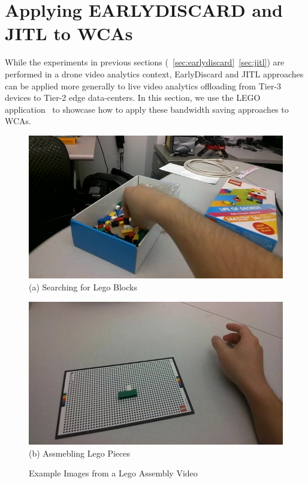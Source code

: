 \section{Applying {\xc EARLYDISCARD} and {\xc JITL} to WCAs}
\label{bw:wca}

While the experiments in previous sections
(~\ref{sec:earlydiscard}~\ref{sec:jitl}) are performed in a drone video
analytics context, EarlyDiscard and JITL approaches can be applied more
generally to live video analytics offloading from Tier-3 devices to Tier-2 edge
data-centers. In this section, we use the LEGO
application~\cite{chen2018application} to showcase how to apply these bandwidth
saving approaches to WCAs.

\begin{figure}
\centering
\begin{minipage}[]{0.45\linewidth}
\centering
    \includegraphics[width=\linewidth]{FIGS/lego-search}\\
{(a) Searching for Lego Blocks}
\end{minipage}
\begin{minipage}[]{0.45\linewidth}
\centering
\includegraphics[width=\linewidth]{FIGS/lego-assembled}\\
{(b) Assmebling Lego Pieces}
\end{minipage}
\caption{Example Images from a Lego Assembly Video}
\label{fig:wca-lego-example-images}
\end{figure}

